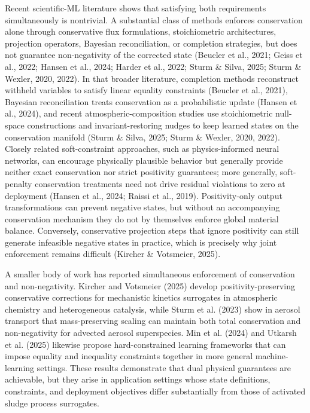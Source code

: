 \documentclass[11pt]{article}
\begin{document}
Recent scientific-ML literature shows that satisfying both requirements simultaneously is nontrivial. A substantial class of methods enforces conservation alone through conservative flux formulations, stoichiometric architectures, projection operators, Bayesian reconciliation, or completion strategies, but does not guarantee non-negativity of the corrected state (Beucler et al., 2021; Geiss et al., 2022; Hansen et al., 2024; Harder et al., 2022; Sturm \& Silva, 2025; Sturm \& Wexler, 2020, 2022). In that broader literature, completion methods reconstruct withheld variables to satisfy linear equality constraints (Beucler et al., 2021), Bayesian reconciliation treats conservation as a probabilistic update (Hansen et al., 2024), and recent atmospheric-composition studies use stoichiometric null-space constructions and invariant-restoring nudges to keep learned states on the conservation manifold (Sturm \& Silva, 2025; Sturm \& Wexler, 2020, 2022). Closely related soft-constraint approaches, such as physics-informed neural networks, can encourage physically plausible behavior but generally provide neither exact conservation nor strict positivity guarantees; more generally, soft-penalty conservation treatments need not drive residual violations to zero at deployment (Hansen et al., 2024; Raissi et al., 2019). Positivity-only output transformations can prevent negative states, but without an accompanying conservation mechanism they do not by themselves enforce global material balance. Conversely, conservative projection steps that ignore positivity can still generate infeasible negative states in practice, which is precisely why joint enforcement remains difficult (Kircher \& Votsmeier, 2025).

A smaller body of work has reported simultaneous enforcement of conservation and non-negativity. Kircher and Votsmeier (2025) develop positivity-preserving conservative corrections for mechanistic kinetics surrogates in atmospheric chemistry and heterogeneous catalysis, while Sturm et al. (2023) show in aerosol transport that mass-preserving scaling can maintain both total conservation and non-negativity for advected aerosol superspecies. Min et al. (2024) and Utkarsh et al. (2025) likewise propose hard-constrained learning frameworks that can impose equality and inequality constraints together in more general machine-learning settings. These results demonstrate that dual physical guarantees are achievable, but they arise in application settings whose state definitions, constraints, and deployment objectives differ substantially from those of activated sludge process surrogates.
\end{document}
